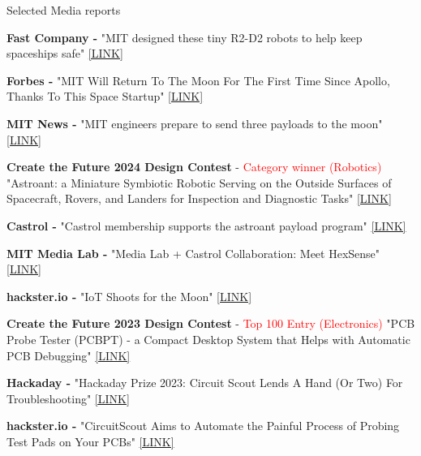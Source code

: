 \documentclass{resume} %
\begin{document}
%
\begin{rSection}{Selected Media reports}

\begin{itemlabel}
\item \textbf{Fast Company -} "MIT designed these tiny R2-D2 robots to help keep spaceships safe" \href{https://www.fastcompany.com/91194519/mit-designed-these-tiny-r2-d2-robots-to-help-keep-spaceships-safe}{[LINK]}
\item \textbf{Forbes - }"MIT Will Return To The Moon For The First Time Since Apollo, Thanks To This Space Startup" \href{https://www.forbes.com/sites/ariannajohnson/2022/11/09/mit-will-return-to-the-moon-for-the-first-time-since-apollo-thanks-to-this-space-startup/?sh=45edf5d86d72}{[LINK]}
\item \textbf{MIT News - } "MIT engineers prepare to send three payloads to the moon" \href{https://news.mit.edu/2025/mit-engineers-prepare-send-three-payloads-moon-0225}{[LINK]}
\item \textbf{Create the Future 2024 Design Contest} - \textcolor{red}{Category winner (Robotics)} "Astroant: a Miniature Symbiotic Robotic Serving on the Outside Surfaces of Spacecraft, Rovers, and Landers for Inspection and Diagnostic Tasks" \href{https://contest.techbriefs.com/2024/entries/robotics-and-automation/13181-0707-232212-astroant-a-miniature-symbiotic-robotic-serving-on-the-outside-surfaces-of-spacecraft-rovers-and-landers-for-inspection-and-diagnostic-tasks}{[LINK]}
\item \textbf{Castrol - } "Castrol membership supports the astroant payload program" \href{https://www.castrol.com/en/global/corporate/about-castrol/newsroom/mit-lunar-landings.html}{[LINK]}
\item \textbf{MIT Media Lab - } "Media Lab + Castrol Collaboration: Meet HexSense" \href{https://www.youtube.com/watch?v=wPBvrFLA74g}{[LINK]}
\item \textbf{hackster.io - } "IoT Shoots for the Moon" \href{https://www.hackster.io/news/iot-shoots-for-the-moon-3e8b97780c54}{[LINK]}
\item \textbf{Create the Future 2023 Design Contest} - \textcolor{red}{Top 100 Entry (Electronics)} "PCB Probe Tester (PCBPT) - a Compact Desktop System that Helps with Automatic PCB Debugging" \href{https://contest.techbriefs.com/2023/entries/electronics/12473-0701-202435-pcb-probe-tester-pcbpt-a-compact-desktop-system-that-helps-with-automatic-pcb-debugging}{[LINK]}
\item \textbf{Hackaday - } "Hackaday Prize 2023: Circuit Scout Lends A Hand (Or Two) For Troubleshooting" \href{https://hackaday.com/2023/08/11/hackaday-prize-2023-circuit-scout-lends-a-hand-or-two-for-troubleshooting/}{[LINK]}
\item \textbf{hackster.io - } "CircuitScout Aims to Automate the Painful Process of Probing Test Pads on Your PCBs" \href{https://www.hackster.io/news/circuitscout-aims-to-automate-the-painful-process-of-probing-test-pads-on-your-pcbs-4f62c34249ee}{[LINK]}

\end{itemlabel}
\end{rSection}
\end{document}
